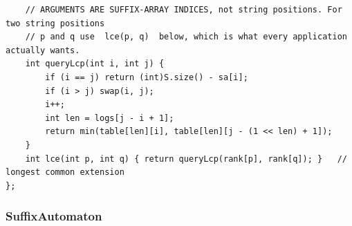 \documentclass[9pt,a4paper,twocolumn]{extarticle}
\begin{document}
\begin{lstlisting}
    // ARGUMENTS ARE SUFFIX-ARRAY INDICES, not string positions. For two string positions
    // p and q use  lce(p, q)  below, which is what every application actually wants.
    int queryLcp(int i, int j) {
        if (i == j) return (int)S.size() - sa[i];
        if (i > j) swap(i, j);
        i++;
        int len = logs[j - i + 1];
        return min(table[len][i], table[len][j - (1 << len) + 1]);
    }
    int lce(int p, int q) { return queryLcp(rank[p], rank[q]); }   // longest common extension
};
\end{lstlisting}

\filbreak
\subsubsection{SuffixAutomaton}
\nopagebreak
\end{document}
